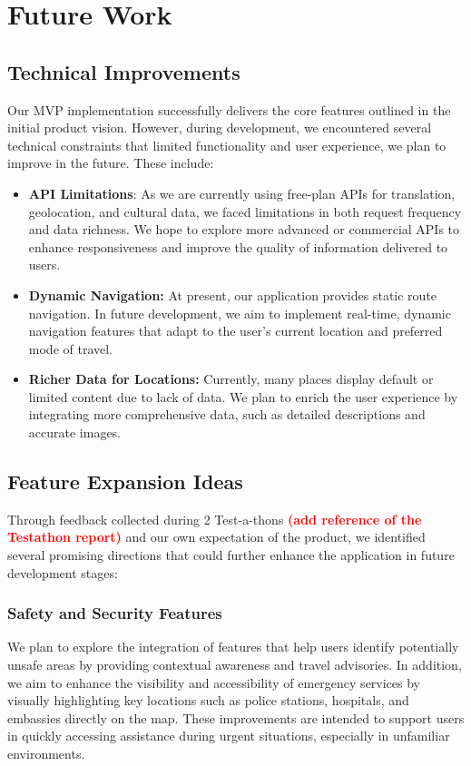 \chapter{Future Work}
\section{Technical Improvements}
Our MVP implementation successfully delivers the core features outlined in the initial product vision. However, during development, we encountered several technical constraints that limited functionality and user experience, we plan to improve in the future. These include:
    \begin{itemize}
        \item \textbf{API Limitations}: As we are currently using free-plan APIs for translation, geolocation, and cultural data, we faced limitations in both request frequency and data richness. We hope to explore more advanced or commercial APIs to enhance responsiveness and improve the quality of information delivered to users.
        \item \textbf{Dynamic Navigation:} At present, our application provides static route navigation. In future development, we aim to implement real-time, dynamic navigation features that adapt to the user’s current location and preferred mode of travel.
        \item \textbf{Richer Data for Locations:} Currently, many places display default or limited content due to lack of data. We plan to enrich the user experience by integrating more comprehensive data, such as detailed descriptions and accurate images.
    \end{itemize}
\section{Feature Expansion Ideas}
Through feedback collected during 2 Test-a-thons \textbf{\textcolor{red}{(add reference of the Testathon report)}} and our own expectation of the product, we identified several promising directions that could further enhance the application in future development stages:

\subsection{Safety and Security Features}
We plan to explore the integration of features that help users identify potentially unsafe areas by providing contextual awareness and travel advisories. In addition, we aim to enhance the visibility and accessibility of emergency services by visually highlighting key locations such as police stations, hospitals, and embassies directly on the map. These improvements are intended to support users in quickly accessing assistance during urgent situations, especially in unfamiliar environments.

